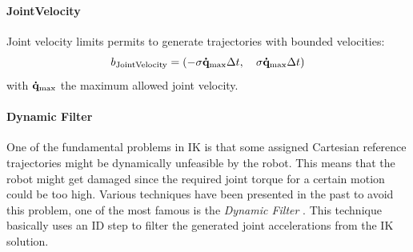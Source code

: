 \paragraph{JointVelocity}
Joint velocity limits permits to generate trajectories with bounded velocities:
\begin{equation}
b_\text{JointVelocity} = \left( -\sigma \mathbf{\dot{q}}_\text{max}\Delta t,\quad \sigma \mathbf{\dot{q}}_\text{max}\Delta t \right)
\end{equation}
with $\mathbf{\dot{q}}_\text{max}$ the maximum allowed joint velocity.

\paragraph{Dynamic Filter} 
One of the fundamental problems in IK is that some assigned Cartesian reference trajectories might be dynamically unfeasible by the robot. This means that the robot might get damaged since the required joint torque for a certain motion could be too high. Various techniques have been presented in the past to avoid this problem, one of the most famous is the \emph{Dynamic Filter} \cite{Yamane:04}. This technique basically uses an ID step to filter the generated joint accelerations from the IK solution. 

